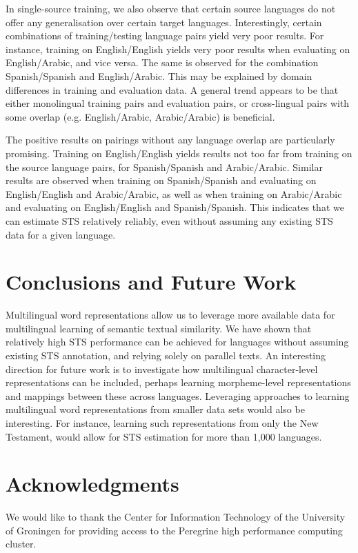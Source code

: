 \documentclass[11pt,a4paper]{article}
\begin{document}
In single-source training, we also observe that certain source languages do not offer any generalisation over certain target languages.
Interestingly, certain combinations of training/testing language pairs yield very poor results.
For instance, training on English/English yields very poor results when evaluating on English/Arabic, and vice versa.
The same is observed for the combination Spanish/Spanish and English/Arabic.
This may be explained by domain differences in training and evaluation data.
A general trend appears to be that either monolingual training pairs and evaluation pairs, or cross-lingual pairs with some overlap (e.g. English/Arabic, Arabic/Arabic) is beneficial.

The positive results on pairings without any language overlap are particularly promising.
Training on English/English yields results not too far from training on the source language pairs, for Spanish/Spanish and Arabic/Arabic.
Similar results are observed when training on Spanish/Spanish and evaluating on English/English and Arabic/Arabic,
as well as when training on Arabic/Arabic and evaluating on English/English and Spanish/Spanish.
This indicates that we can estimate STS relatively reliably, even without assuming any existing STS data for a given language.

\section{Conclusions and Future Work}

Multilingual word representations allow us to leverage more available data for multilingual learning of semantic textual similarity.
We have shown that relatively high STS performance can be achieved for languages without assuming existing STS annotation, and relying solely on parallel texts.
An interesting direction for future work is to investigate how multilingual character-level representations can be included, perhaps learning morpheme-level representations and mappings between these across languages.
Leveraging approaches to learning multilingual word representations from smaller data sets would also be interesting.
For instance, learning such representations from only the New Testament, would allow for STS estimation for more than 1,000 languages.

\section*{Acknowledgments}
We would like to thank the Center for Information Technology of the University of Groningen for providing access to the Peregrine high performance computing cluster.


%
%


\end{document}

